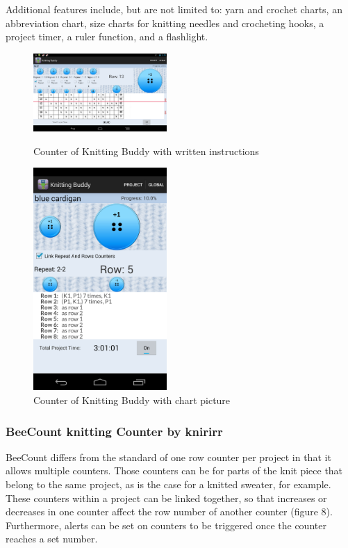 \documentclass[a4paper,11pt]{kth-mag}
\begin{document}
Additional features include, but are not limited to: yarn and crochet charts,
an abbreviation chart, size charts for knitting needles and crocheting hooks,
a project timer, a ruler function, and a flashlight.

\begin{figure}[H]
\centering
\begin{minipage}{.5\textwidth}
  \centering
  \includegraphics[width=2in]{images/image04.png}
  \caption{Counter of Knitting Buddy with written instructions}
  \label{fig_knittingbuddy1}
\end{minipage}%
\begin{minipage}{.5\textwidth}
  \centering
  \includegraphics[width=2in]{images/image05.png}
  \caption{Counter of Knitting Buddy with chart picture}
  \label{fig_knittingbuddy}
\end{minipage}
\end{figure}


\subsubsection{BeeCount knitting Counter by knirirr}
BeeCount differs from the standard of one row counter per project in that it
allows multiple counters. Those counters can be for parts of the knit piece that
 belong to the same project, as is the case for a knitted sweater, for example.
These counters within a project can be linked together, so that increases or
decreases in one counter affect the row number of another counter (figure 8).
Furthermore, alerts can be set on counters to be triggered once the counter
reaches a set number.
\end{document}
